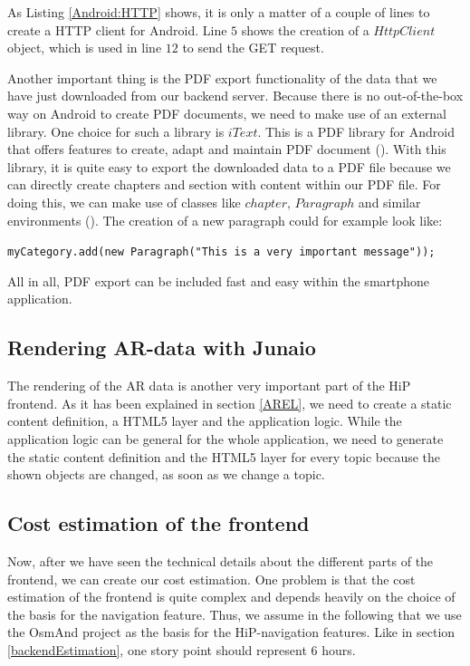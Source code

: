As Listing \ref{Android:HTTP} shows, it is only a matter of a couple of lines to create a \ac{HTTP} client for Android. Line $5$ shows the creation of a $HttpClient$ object, which is used in line $12$ to send the GET request.

Another important thing is the \ac{PDF} export functionality of the data that we have just downloaded from our backend server.
Because there is no out-of-the-box way on Android to create \ac{PDF} documents, we need to make use of an external library. One choice for such a library is $iText$. This is a \ac{PDF} library for Android that offers features to create, adapt and maintain \ac{PDF} document (\cite{itext2015}).
With this library, it is quite easy to export the downloaded data to a \ac{PDF} file because we can directly create chapters and section with content within our \ac{PDF} file. For doing this, we can make use of classes like $chapter$, $Paragraph$ and similar environments (\cite{pdfCreation}). The creation of a new paragraph could for example look like:

\verb|myCategory.add(new Paragraph("This is a very important message"));|  

All in all, \ac{PDF} export can be included fast and easy within the smartphone application.

\subsection{Rendering AR-data with Junaio}
The rendering of the \ac{AR} data is another very important part of the \ac{HiP} frontend. As it has been explained in section \ref{AREL}, we need to create a static content definition, a \ac{HTML5} layer and the application logic. While the application logic can be general for the whole application, we need to generate the static content definition and the \ac{HTML5} layer for every topic because the shown objects are changed, as soon as we change a topic.
 
\subsection{Cost estimation of the frontend}	
Now, after we have seen the technical details about the different parts of the frontend, we can create our cost estimation. One problem is that the cost estimation of the frontend is quite complex and depends heavily on the choice of the basis for the navigation feature. Thus, we assume in the following that we use the \ac{OsmAnd} project as the basis for the \ac{HiP}-navigation features. Like in section \ref{backendEstimation}, one story point should represent 6 hours.

